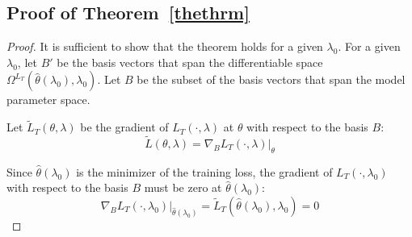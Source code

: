 \documentclass[10pt,letterpaper]{article}
\begin{document}
\subsection{Proof of Theorem~\ref{thethrm}}

\begin{proof}
It is sufficient to show that the theorem holds for a given $\lambda_0$. For a given $\lambda_0$, let $B'$ be the basis vectors that span the differentiable space $\Omega^{L_T}(\hat \theta(\lambda_0), \lambda_0)$. Let $B$ be the subset of the basis vectors that span the model parameter space.

Let $\tilde L_T(\theta, \lambda)$ be the gradient of $L_T(\cdot, \lambda)$ at $\theta$ with respect to the basis $B$:
\begin{equation}
\tilde L(\theta, \lambda) = \nabla_{B} L_T(\cdot, \lambda) |_\theta
\end{equation}

Since $\hat \theta(\lambda_0)$ is the minimizer of the training loss, the gradient of $L_T(\cdot, \lambda_0)$ with respect to the basis $B$ must be zero at $\hat \theta(\lambda_0)$:
\begin{equation}
\nabla_{B} L_T(\cdot, \lambda_0)|_{\hat \theta(\lambda_0)} = \tilde L_T(\hat \theta(\lambda_0), \lambda_0) = 0
\end{equation}


\end{proof}
\end{document}
